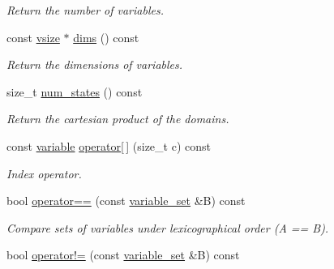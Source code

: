 \begin{DoxyCompactItemize}
\begin{DoxyCompactList}\small\item\em Return the number of variables. \end{DoxyCompactList}\item 
const \hyperlink{classmerlin_1_1variable__set_a05d7a8291564fa7fb236a5e9cb65c734}{vsize} $\ast$ \hyperlink{classmerlin_1_1variable__set_a406034ff9ce1d4789cf015bd3066386f}{dims} () const \hypertarget{classmerlin_1_1variable__set_a406034ff9ce1d4789cf015bd3066386f}{}\label{classmerlin_1_1variable__set_a406034ff9ce1d4789cf015bd3066386f}

\begin{DoxyCompactList}\small\item\em Return the dimensions of variables. \end{DoxyCompactList}\item 
size\+\_\+t \hyperlink{classmerlin_1_1variable__set_aa468382bd1a35e5a682d80533e576266}{num\+\_\+states} () const \hypertarget{classmerlin_1_1variable__set_aa468382bd1a35e5a682d80533e576266}{}\label{classmerlin_1_1variable__set_aa468382bd1a35e5a682d80533e576266}

\begin{DoxyCompactList}\small\item\em Return the cartesian product of the domains. \end{DoxyCompactList}\item 
const \hyperlink{classmerlin_1_1variable}{variable} \hyperlink{classmerlin_1_1variable__set_aa10f4084fe699e1c62a7af92d6d8c501}{operator\mbox{[}$\,$\mbox{]}} (size\+\_\+t c) const \hypertarget{classmerlin_1_1variable__set_aa10f4084fe699e1c62a7af92d6d8c501}{}\label{classmerlin_1_1variable__set_aa10f4084fe699e1c62a7af92d6d8c501}

\begin{DoxyCompactList}\small\item\em Index operator. \end{DoxyCompactList}\item 
bool \hyperlink{classmerlin_1_1variable__set_ac978fa6aaa2afae98cf21ad656b8eb58}{operator==} (const \hyperlink{classmerlin_1_1variable__set}{variable\+\_\+set} \&B) const \hypertarget{classmerlin_1_1variable__set_ac978fa6aaa2afae98cf21ad656b8eb58}{}\label{classmerlin_1_1variable__set_ac978fa6aaa2afae98cf21ad656b8eb58}

\begin{DoxyCompactList}\small\item\em Compare sets of variables under lexicographical order (A == B). \end{DoxyCompactList}\item 
bool \hyperlink{classmerlin_1_1variable__set_a4283a6dd10d20ba2fd8ce788a3db4fbc}{operator!=} (const \hyperlink{classmerlin_1_1variable__set}{variable\+\_\+set} \&B) const \hypertarget{classmerlin_1_1variable__set_a4283a6dd10d20ba2fd8ce788a3db4fbc}{}\label{classmerlin_1_1variable__set_a4283a6dd10d20ba2fd8ce788a3db4fbc}


\end{DoxyCompactItemize}
